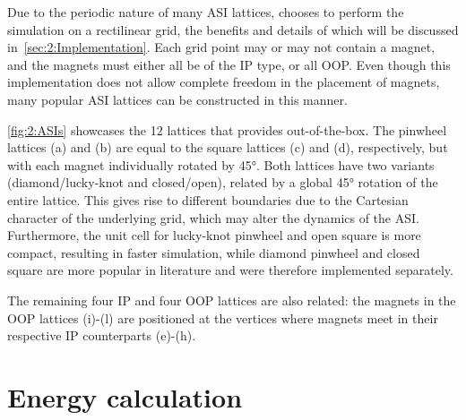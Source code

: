 Due to the periodic nature of many ASI lattices, \hotspice chooses to perform the simulation on a rectilinear grid, the benefits and details of which will be discussed in~\cref{sec:2:Implementation}.
Each grid point may or may not contain a magnet, and the magnets must either all be of the IP type, or all OOP.
Even though this implementation does not allow complete freedom in the placement of magnets, many popular ASI lattices can be constructed in this manner. \par


\cref{fig:2:ASIs} showcases the 12 lattices that \hotspice provides out-of-the-box. The pinwheel lattices (a) and (b) are equal to the square lattices (c) and (d), respectively, but with each magnet individually rotated by \ang{45}. Both lattices have two variants (diamond/lucky-knot and closed/open), related by a global \ang{45} rotation of the entire lattice. This gives rise to different boundaries due to the Cartesian character of the underlying grid, which may alter the dynamics of the ASI. Furthermore, the unit cell for lucky-knot pinwheel and open square is more compact, resulting in faster simulation, while diamond pinwheel and closed square are more popular in literature and were therefore implemented separately. \par %
The remaining four IP and four OOP lattices are also related: the magnets in the OOP lattices (i)-(l) are positioned at the vertices where magnets meet in their respective IP counterparts (e)-(h). \\\par


\section{Energy calculation}
